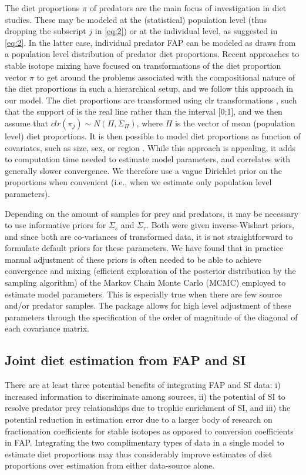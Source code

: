 \documentclass{article}%
\begin{document}
\begin{spacing}{1.9}
\begin{flushleft}
The diet proportions $\pi$ of predators are the main focus of investigation
in diet studies. These may be modeled at the (statistical) population
level (thus dropping the subscript $j$ in \autoref{eq:2}) or at the
individual level, as suggested in \autoref{eq:2}. In the latter case,
individual predator FAP can be modeled as draws from a population
level distribution of predator diet proportions. Recent approaches to stable
isotope mixing have focused on transformations of the diet proportion
vector $\pi$ to get around the
problems associated with the compositional nature of the diet
proportions in such a hierarchical setup, and we follow this approach
in our model. The diet proportions are transformed using clr
transformations \citep{semmens_quantifying_2009}, such that the
support of is the real line rather than the interval [0;1], and we
then assume that $clr(\pi_j) \sim N(\Pi,\Sigma_{\Pi})$, where $\Pi$ is the
vector of mean (population level) diet proportions. It is
then possible to model diet proportions as function of
covariates, such as size, sex, or region \citep[i.e., in a regression
formulation,][]{parnell_bayesian_2012}. While this approach is appealing, it adds to computation time needed
to estimate model parameters, and correlates with generally slower convergence. We therefore use a vague Dirichlet prior
on the proportions when convenient (i.e., when we estimate only
population level parameters).

Depending on the amount of samples for prey and predators, it
may be necessary to use informative priors for $\Sigma_{s}$ and
$\Sigma_{\tau}$. Both were given inverse-Wishart priors, and since both are co-variances of transformed data, it is
not straightforward to formulate default priors for these parameters. We have found that in practice manual adjustment of these priors
is often needed to be able to achieve convergence and mixing
(efficient exploration of the posterior distribution by the sampling
algorithm) of the Markov Chain Monte Carlo (MCMC) employed to estimate
model parameters. This is especially true when there are few source and/or predator samples. The
package allows for high level adjustment of these parameters through
the specification of the order of magnitude of the diagonal of each
covariance matrix. 

\subsection{Joint diet estimation from FAP and SI}
There are at least three potential benefits of integrating FAP and SI
data: i) increased information to discriminate among sources, ii) the
potential of SI to resolve predator prey relationships due to trophic
enrichment of SI, and iii) the potential reduction in estimation error
due to a larger body of research on fractionation coefficients for stable
isotopes as opposed to conversion coefficients in FAP. Integrating the two complimentary types of data
in a single model to estimate diet proportions may thus considerably
improve estimates of diet proportions over estimation from either
data-source alone.


\end{flushleft}
\end{spacing}
\end{document}
